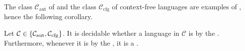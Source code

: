 The class $\mathcal{C}_\text{aut}$ of  and the class
$\mathcal{C}_{\text{cfg}}$ of context-free languages are examples of
, hence the following corollary.

\begin{corollary}
    \label{aut-cfg-infix:cor}
    Let $\mathcal{C} \in \{  \mathcal{C}_\text{aut}, \mathcal{C}_{\text{cfg}} \}$.
    It is decidable whether a language in $\mathcal{C}$ is 
    by the .
    Furthermore, whenever it is  by the ,
    it is a .
\end{corollary}
